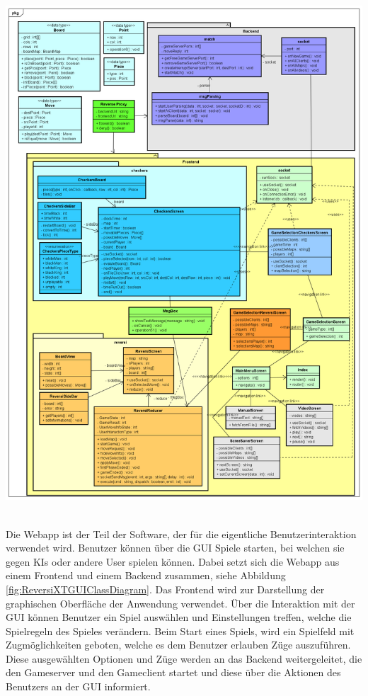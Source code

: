 \documentclass[12pt,a4paper,bibliography=totocnumbered,listof=totocnumbered]{article}
\begin{document}
\vspace{1em}
\begin{minipage}{\linewidth}
	\centering
	\includegraphics[width=0.9\linewidth]{pics/ReversiXTGUIClassDiagramm.png}
	\label{fig:ReversiXTGUIClassDiagram}
\end{minipage}
\\

Die Webapp ist der Teil der Software, der für die eigentliche Benutzerinteraktion verwendet wird. Benutzer können über die \ac{GUI}
Spiele starten, bei welchen sie gegen KIs oder andere User spielen können. Dabei setzt sich die Webapp aus einem Frontend und 
einem Backend zusammen, siehe Abbildung \ref{fig:ReversiXTGUIClassDiagram}. 
Das Frontend wird zur Darstellung der graphischen Oberfläche der Anwendung verwendet. Über die Interaktion mit der 
\ac{GUI} können Benutzer ein Spiel auswählen und Einstellungen treffen, welche die Spielregeln des Spieles verändern.
Beim Start eines Spiels, wird ein Spielfeld mit Zugmöglichkeiten geboten, welche es dem Benutzer erlauben 
Züge auszuführen.
Diese ausgewählten Optionen und Züge werden an das Backend weitergeleitet, die den Gameserver und den Gameclient 
startet und diese über die Aktionen des Benutzers an der \ac{GUI} informiert. 
\end{document}
